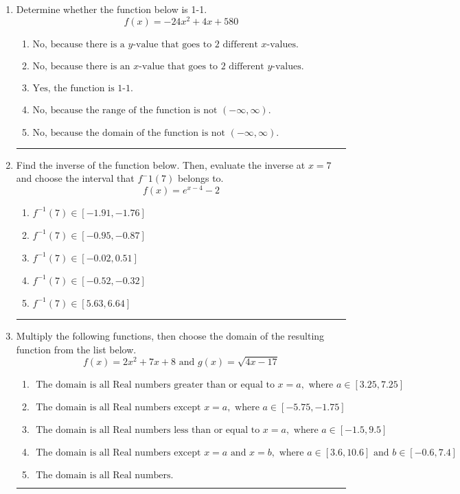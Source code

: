 \documentclass[14pt]{extbook}
\newcommand{\litem}[1]{\item#1\hspace*{-1cm}\rule{\textwidth}{0.4pt}}
\begin{document}
\begin{enumerate}
\litem{
Determine whether the function below is 1-1.\[ f(x) = -24 x^2 + 4 x + 580 \]\begin{enumerate}[label=\Alph*.]
\item \( \text{No, because there is a $y$-value that goes to 2 different $x$-values.} \)
\item \( \text{No, because there is an $x$-value that goes to 2 different $y$-values.} \)
\item \( \text{Yes, the function is 1-1.} \)
\item \( \text{No, because the range of the function is not $(-\infty, \infty)$.} \)
\item \( \text{No, because the domain of the function is not $(-\infty, \infty)$.} \)

\end{enumerate} }
\litem{
Find the inverse of the function below. Then, evaluate the inverse at $x = 7$ and choose the interval that $f^-1(7)$ belongs to.\[ f(x) = e^{x-4}-2 \]\begin{enumerate}[label=\Alph*.]
\item \( f^{-1}(7) \in [-1.91, -1.76] \)
\item \( f^{-1}(7) \in [-0.95, -0.87] \)
\item \( f^{-1}(7) \in [-0.02, 0.51] \)
\item \( f^{-1}(7) \in [-0.52, -0.32] \)
\item \( f^{-1}(7) \in [5.63, 6.64] \)

\end{enumerate} }
\litem{
Multiply the following functions, then choose the domain of the resulting function from the list below.\[ f(x) = 2x^{2} +7 x + 8 \text{ and } g(x) = \sqrt{4x-17}  \]\begin{enumerate}[label=\Alph*.]
\item \( \text{ The domain is all Real numbers greater than or equal to } x = a, \text{ where } a \in [3.25, 7.25] \)
\item \( \text{ The domain is all Real numbers except } x = a, \text{ where } a \in [-5.75, -1.75] \)
\item \( \text{ The domain is all Real numbers less than or equal to } x = a, \text{ where } a \in [-1.5, 9.5] \)
\item \( \text{ The domain is all Real numbers except } x = a \text{ and } x = b, \text{ where } a \in [3.6, 10.6] \text{ and } b \in [-0.6, 7.4] \)
\item \( \text{ The domain is all Real numbers. } \)


\end{enumerate}}
\end{enumerate}
\end{document}
